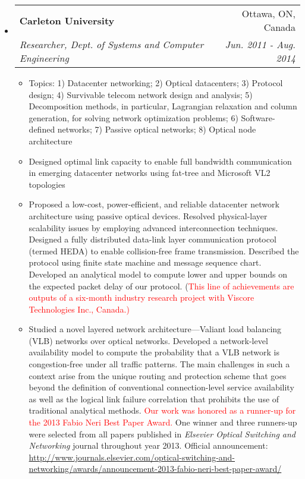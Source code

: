 \documentclass[letterpaper,11pt]{article}
\makeatletter
\newcommand{\ressubheading}[4]{
\begin{tabular*}{6.69in}{l@{\extracolsep{\fill}}r}
        \textbf{#1} & #2 \\
        \textit{#3} & \textit{#4} \\
\end{tabular*}\vspace{-6pt}
}
\newcommand{\resitem}[1]{\item #1 \vspace{-2pt}}
\makeatother
\begin{document}
\begin{itemize}%
\setlength{\itemindent}{-0.075in}

\item
    \ressubheading{Carleton University}{Ottawa, ON, Canada} %
    {Researcher, Dept. of Systems and Computer Engineering}{Jun. 2011 - Aug. 2014} %
    \begin{itemize}
        \resitem{Topics: 1) Datacenter networking; 2) Optical datacenters; 3) Protocol design; 4) Survivable telecom network design and analysis; 5) Decomposition methods, in particular, Lagrangian relaxation and column generation, for solving network optimization problems; 6) Software-defined networks; 7) Passive optical networks; 8) Optical node architecture}
        \resitem{Designed optimal link capacity to enable full bandwidth communication in emerging datacenter networks using fat-tree and Microsoft VL2 topologies}
        \resitem{Proposed a low-cost, power-efficient, and reliable datacenter network architecture using passive optical devices. Resolved physical-layer scalability issues by employing advanced interconnection techniques. Designed a fully distributed data-link layer communication protocol (termed HEDA) to enable collision-free frame transmission. Described the protocol using finite state machine and message sequence chart. Developed an analytical model to compute lower and upper bounds on the expected packet delay of our protocol. (\textcolor{Red}{This line of achievements are outputs of a six-month industry research project with Viscore Technologies Inc., Canada.)}}
        \resitem{Studied a novel layered network architecture---Valiant load balancing (VLB) networks over optical networks. Developed a network-level availability model to compute the probability that a VLB network is congestion-free under all traffic patterns. The main challenges in such a context arise from the unique routing and protection scheme that goes beyond the definition of conventional connection-level service availability as well as the logical link failure correlation that prohibits the use of traditional analytical methods. \textcolor{Red}{Our work was honored as a runner-up for the 2013 Fabio Neri Best Paper Award.} One winner and three runners-up were selected from all papers published in \textit{Elsevier Optical Switching and Networking} journal throughout year 2013. Official announcement: \url{http://www.journals.elsevier.com/optical-switching-and-networking/awards/announcement-2013-fabio-neri-best-paper-award/}}


\end{itemize}
\end{itemize}
\end{document}
